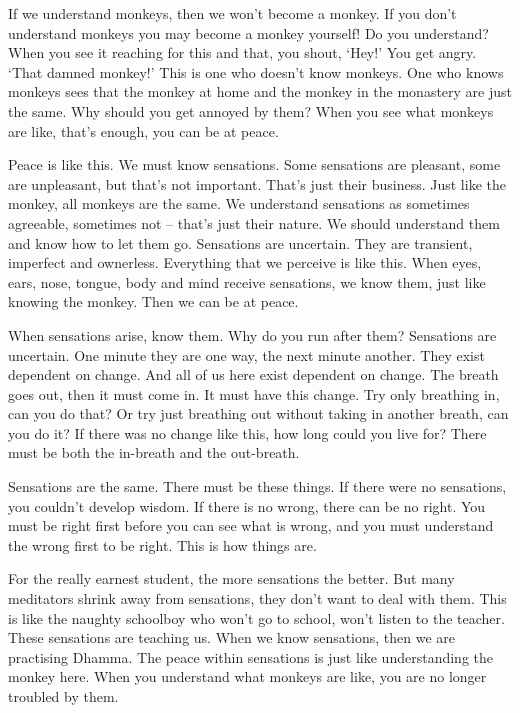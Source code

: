If we understand monkeys, then we won't become a monkey. If you don't understand monkeys you may become a monkey yourself! Do you understand? When you see it reaching for this and that, you shout, `Hey!' You get angry. `That damned monkey!' This is one who doesn't know monkeys. One who knows monkeys sees that the monkey at home and the monkey in the monastery are just the same. Why should you get annoyed by them? When you see what monkeys are like, that's enough, you can be at peace.

Peace is like this. We must know sensations. Some sensations are pleasant, some are unpleasant, but that's not important. That's just their business. Just like the monkey, all monkeys are the same. We understand sensations as sometimes agreeable, sometimes not -- that's just their nature. We should understand them and know how to let them go. Sensations are uncertain. They are transient, imperfect and ownerless. Everything that we perceive is like this. When eyes, ears, nose, tongue, body and mind receive sensations, we know them, just like knowing the monkey. Then we can be at peace.

When sensations arise, know them. Why do you run after them? Sensations are uncertain. One minute they are one way, the next minute another. They exist dependent on change. And all of us here exist dependent on change. The breath goes out, then it must come in. It must have this change. Try only breathing in, can you do that? Or try just breathing out without taking in another breath, can you do it? If there was no change like this, how long could you live for? There must be both the in-breath and the out-breath.

Sensations are the same. There must be these things. If there were no sensations, you couldn't develop wisdom. If there is no wrong, there can be no right. You must be right first before you can see what is wrong, and you must understand the wrong first to be right. This is how things are.

For the really earnest student, the more sensations the better. But many meditators shrink away from sensations, they don't want to deal with them. This is like the naughty schoolboy who won't go to school, won't listen to the teacher. These sensations are teaching us. When we know sensations, then we are practising Dhamma. The peace within sensations is just like understanding the monkey here. When you understand what monkeys are like, you are no longer troubled by them.

